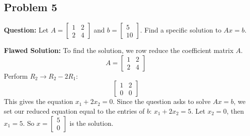 \documentclass{article}
\begin{document}
\subsection{Problem 5}
\textbf{Question:} Let $A = \begin{bmatrix} 1 & 2 \\ 2 & 4 \end{bmatrix}$ and $b = \begin{bmatrix} 5 \\ 10 \end{bmatrix}$. Find a specific solution to $Ax = b$.

\textbf{Flawed Solution:}
To find the solution, we row reduce the coefficient matrix $A$.
\[ A = \begin{bmatrix} 1 & 2 \\ 2 & 4 \end{bmatrix} \]
Perform $R_2 \to R_2 - 2R_1$:
\[ \begin{bmatrix} 1 & 2 \\ 0 & 0 \end{bmatrix} \]
This gives the equation $x_1 + 2x_2 = 0$. 
Since the question asks to solve $Ax = b$, we set our reduced equation equal to the entries of $b$:
$x_1 + 2x_2 = 5$.
Let $x_2 = 0$, then $x_1 = 5$.
So $x = \begin{bmatrix} 5 \\ 0 \end{bmatrix}$ is the solution.
\end{document}
